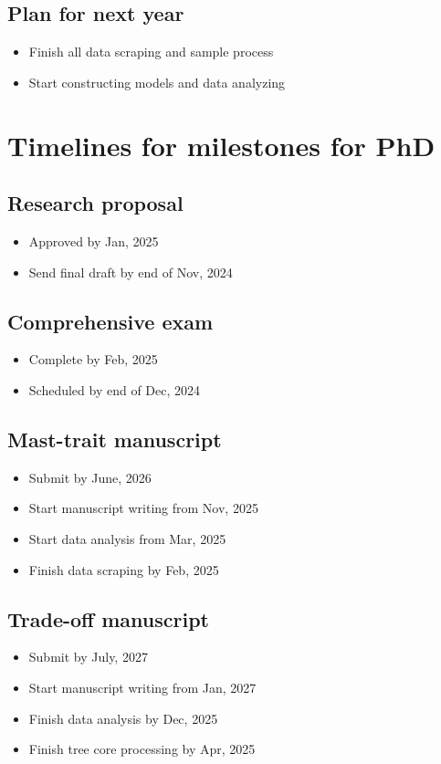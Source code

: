 \documentclass[11pt,letter]{article}
\begin{document}
\subsection{Plan for next year}
 \begin{itemize}
 	\item Finish all data scraping and sample process
 	\item Start constructing models and data analyzing
 \end{itemize}
\section{Timelines for milestones for PhD}
\subsection{Research proposal}
 \begin{itemize}
	\item Approved by Jan, 2025
	\item Send final draft by end of Nov, 2024
	\end{itemize}
\subsection{Comprehensive exam}
 \begin{itemize}
	\item Complete by Feb, 2025
	\item Scheduled by end of Dec, 2024
	\end{itemize}
\subsection{Mast-trait manuscript}
 \begin{itemize}
	\item Submit by June, 2026
	\item Start manuscript writing from Nov, 2025
	\item Start data analysis from Mar, 2025
	\item Finish data scraping by Feb, 2025
	\end{itemize}
\subsection{Trade-off manuscript}
 \begin{itemize}
	\item Submit by July, 2027
	\item Start manuscript writing from Jan, 2027
	\item Finish data analysis by Dec, 2025
	\item Finish tree core processing by Apr, 2025
	\end{itemize}
\end{document}
